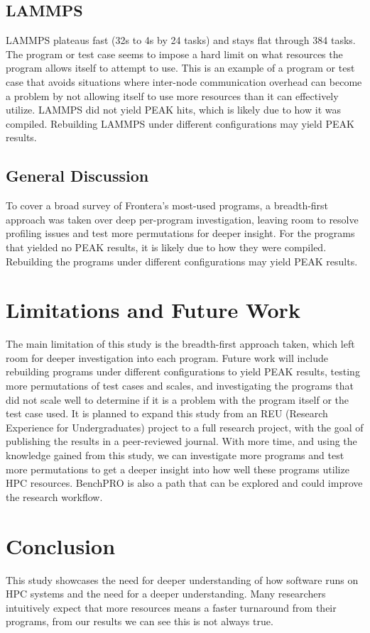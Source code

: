 \documentclass[conference]{IEEEtran}
\begin{document}
\subsection{LAMMPS}
LAMMPS plateaus fast (32s to 4s by 24 tasks) and stays flat through 384 tasks. The program or test case seems to impose a hard limit on what resources the program allows itself to attempt to use. This is an example of a program or test case that avoids situations where inter-node communication overhead can become a problem by not allowing itself to use more resources than it can effectively utilize. LAMMPS did not yield PEAK hits, which is likely due to how it was compiled. Rebuilding LAMMPS under different configurations may yield PEAK results.

\subsection{General Discussion}
To cover a broad survey of Frontera's most-used programs, a breadth-first approach was taken over deep per-program investigation, leaving room to resolve profiling issues and test more permutations for deeper insight. For the programs that yielded no PEAK results, it is likely due to how they were compiled. Rebuilding the programs under different configurations may yield PEAK results.

\section{Limitations and Future Work}
The main limitation of this study is the breadth-first approach taken, which left room for deeper investigation into each program. Future work will include rebuilding programs under different configurations to yield PEAK results, testing more permutations of test cases and scales, and investigating the programs that did not scale well to determine if it is a problem with the program itself or the test case used. It is planned to expand this study from an REU (Research Experience for Undergraduates) project to a full research project, with the goal of publishing the results in a peer-reviewed journal. With more time, and using the knowledge gained from this study, we can investigate more programs and test more permutations to get a deeper insight into how well these programs utilize HPC resources. BenchPRO is also a path that can be explored and could improve the research workflow.

\section{Conclusion}
This study showcases the need for deeper understanding of how software runs on HPC systems and the need for a deeper understanding. Many researchers intuitively expect that more resources means a faster turnaround from their programs, from our results we can see this is not always true.
\end{document}
